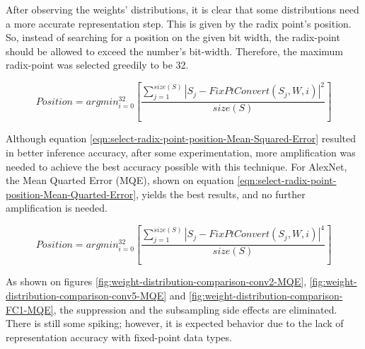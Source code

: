 After observing the weights' distributions, it is clear that some distributions need a more accurate representation step. This is given by the radix point's position. So, instead of searching for a position on the given bit width, the radix-point should be allowed to exceed the number's bit-width. Therefore, the maximum radix-point was selected greedily to be 32.

\begin{equation}
	\label{eqn:select-radix-point-position-Mean-Squared-Error}
	Position = argmin_{i=0}^{32}[\frac{\sum_{j=1}^{size(S)} |S_j - FixPtConvert(S_j, W, i)|^2 }{size(S)}]
\end{equation}

Although equation \ref{eqn:select-radix-point-position-Mean-Squared-Error} resulted in better inference accuracy, after some experimentation, more amplification was needed to achieve the best accuracy possible with this technique. For AlexNet, the Mean Quarted Error (MQE), shown on equation \ref{eqn:select-radix-point-position-Mean-Quarted-Error}, yields the best results, and no further amplification is needed.

\begin{equation}
	\label{eqn:select-radix-point-position-Mean-Quarted-Error}
	Position = argmin_{i=0}^{32}[\frac{\sum_{j=1}^{size(S)} |S_j - FixPtConvert(S_j, W, i)|^4 }{size(S)}]
\end{equation}

As shown on figures \ref{fig:weight-distribution-comparison-conv2-MQE}, \ref{fig:weight-distribution-comparison-conv5-MQE} and \ref{fig:weight-distribution-comparison-FC1-MQE}, the suppression and the subsampling side effects are eliminated. There is still some spiking; however, it is expected behavior due to the lack of representation accuracy with fixed-point data types.

